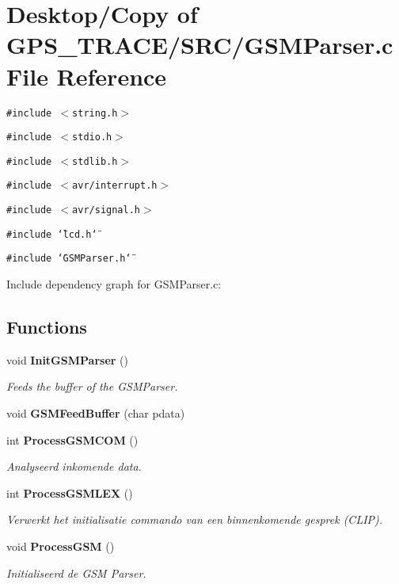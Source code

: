 \section{Desktop/Copy of GPS\_\-TRACE/SRC/GSMParser.c File Reference}
\label{_g_s_m_parser_8c}
{\tt \#include $<$string.h$>$}\par
{\tt \#include $<$stdio.h$>$}\par
{\tt \#include $<$stdlib.h$>$}\par
{\tt \#include $<$avr/interrupt.h$>$}\par
{\tt \#include $<$avr/signal.h$>$}\par
{\tt \#include \char`\"{}lcd.h\char`\"{}}\par
{\tt \#include \char`\"{}GSMParser.h\char`\"{}}\par


Include dependency graph for GSMParser.c:\subsection*{Functions}
\begin{CompactItemize}
\item 
void {\bf InitGSMParser} ()
\begin{CompactList}\small\item\em Feeds the buffer of the GSMParser. \item\end{CompactList}\item 
void {\bf GSMFeedBuffer} (char pdata)
\item 
int {\bf ProcessGSMCOM} ()
\begin{CompactList}\small\item\em Analyseerd inkomende data. \item\end{CompactList}\item 
int {\bf ProcessGSMLEX} ()
\begin{CompactList}\small\item\em Verwerkt het initialisatie commando van een binnenkomende gesprek (CLIP). \item\end{CompactList}\item 
void {\bf ProcessGSM} ()
\begin{CompactList}\small\item\em Initialiseerd de GSM Parser. \item\end{CompactList}\end{CompactItemize}
